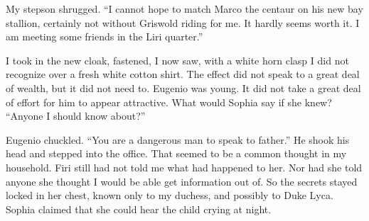 \documentclass{article}
\begin{document}
My stepson shrugged. ``I cannot hope to match Marco the centaur on his
new bay stallion, certainly not without Griswold riding for me. It hardly
seems worth it. I am meeting some friends in the Liri quarter.''

I took in the new cloak, fastened, I now saw, with a white horn clasp
I did not recognize over a fresh white cotton shirt. The effect did
not speak to a great deal of wealth, but it did not need to. Eugenio
was young. It did not take a great deal of effort for him to appear
attractive. What would Sophia say if she knew? ``Anyone I should know
about?''

Eugenio chuckled. ``You are a dangerous man to speak to father.'' He
shook his head and stepped into the office. That seemed to be a common
thought in my household. Firi still had not told me what had happened
to her. Nor had she told anyone she thought I would be able get
information out of. So the secrets stayed locked in her chest, known
only to my duchess, and possibly to Duke Lyca. Sophia claimed that she
could hear the child crying at night. 
\end{document}
